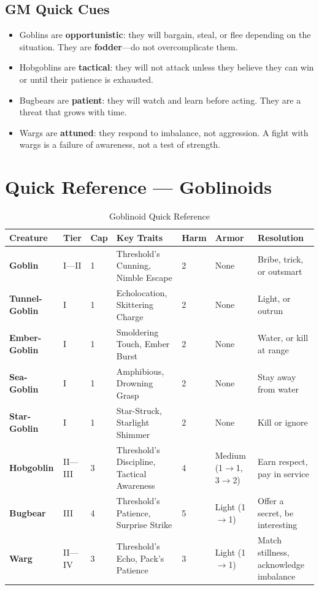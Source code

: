 \subsection{GM Quick Cues}

\begin{itemize}
    \item Goblins are \textbf{opportunistic}: they will bargain, steal, or flee depending on the situation. They are \textbf{fodder}---do not overcomplicate them.
    \item Hobgoblins are \textbf{tactical}: they will not attack unless they believe they can win or until their patience is exhausted.
    \item Bugbears are \textbf{patient}: they will watch and learn before acting. They are a threat that grows with time.
    \item Wargs are \textbf{attuned}: they respond to imbalance, not aggression. A fight with wargs is a failure of awareness, not a test of strength.
\end{itemize}

\section{Quick Reference --- Goblinoids}

\begin{table}[h]
\centering
\begin{tabular}{|l|l|l|l|l|l|l|}
\hline
\textbf{Creature} & \textbf{Tier} & \textbf{Cap} & \textbf{Key Traits} & \textbf{Harm} & \textbf{Armor} & \textbf{Resolution} \\
\hline
\textbf{Goblin} & I---II & 1 & Threshold's Cunning, Nimble Escape & 2 & None & Bribe, trick, or outsmart \\
\textbf{Tunnel-Goblin} & I & 1 & Echolocation, Skittering Charge & 2 & None & Light, or outrun \\
\textbf{Ember-Goblin} & I & 1 & Smoldering Touch, Ember Burst & 2 & None & Water, or kill at range \\
\textbf{Sea-Goblin} & I & 1 & Amphibious, Drowning Grasp & 2 & None & Stay away from water \\
\textbf{Star-Goblin} & I & 1 & Star-Struck, Starlight Shimmer & 2 & None & Kill or ignore \\
\textbf{Hobgoblin} & II---III & 3 & Threshold's Discipline, Tactical Awareness & 4 & Medium (1$\rightarrow$1, 3$\rightarrow$2) & Earn respect, pay in service \\
\textbf{Bugbear} & III & 4 & Threshold's Patience, Surprise Strike & 5 & Light (1$\rightarrow$1) & Offer a secret, be interesting \\
\textbf{Warg} & II---IV & 3 & Threshold's Echo, Pack's Patience & 3 & Light (1$\rightarrow$1) & Match stillness, acknowledge imbalance \\
\hline
\end{tabular}
\caption{Goblinoid Quick Reference}
\end{table}

